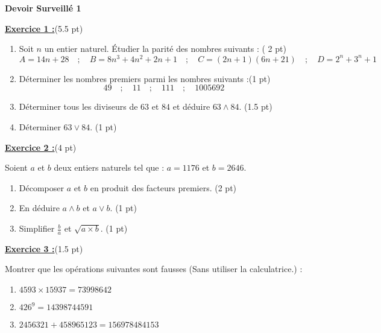 \documentclass[12pt,a4paper]{article}
\begin{document}
\pagestyle{fancy}
\fancyhf{} %
\fancyfoot[C]{\thepage} %


\begin{center}
    \textbf{\Large  Devoir Surveillé 1}
\end{center}

\underline{\large\textbf{Exercice 1 :}}(5.5 pt)
\begin{enumerate}
    \item Soit $n$ un entier naturel. Étudier la parité des nombres suivants : ( 2 pt)
    $$A = 14n + 28\quad;\quad B = 8n^3 + 4n^2 + 2n + 1 \quad;\quad C = (2n + 1)(6n + 21) \quad ; \quad D = 2^n + 3^n + 1$$
    \item Déterminer les nombres premiers parmi les nombres suivants :(1 pt)
    $$49\quad;\quad 11\quad;\quad 111\quad;\quad 1005692$$
    \item Déterminer tous les diviseurs de $63$ et $84$ et déduire $63\wedge 84$. (1.5 pt)
    \item Déterminer $63\vee 84$. (1 pt)
\end{enumerate}

\underline{\large\textbf{Exercice 2 :}}(4 pt)

Soient $a$ et $b$ deux entiers naturels tel que : $a = 1176$ et $b = 2646$.
\begin{enumerate}
    \item Décomposer $a$ et $b$ en produit des facteurs premiers. (2 pt)
    \item En déduire $a\wedge b$ et $a\vee b$. (1 pt)
    \item Simplifier $\displaystyle\frac{b}{a}$ et $\sqrt{a\times b}$. (1 pt)
    
\end{enumerate}

\underline{\large\textbf{Exercice 3 :}}(1.5 pt)

 Montrer que les opérations suivantes sont fausses (Sans utiliser la calculatrice.) :
    \begin{enumerate}
        \item $4593 \times 15937 = 73998642$
        \item $426^{9} = 14398744591$
        \item $2456321 + 458965123 = 156978484153$
    \end{enumerate}
\end{document}
